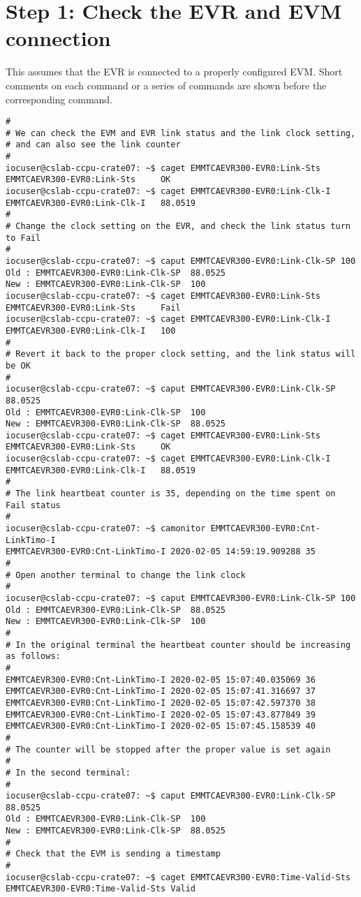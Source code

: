 \documentclass[11pt
  , a4paper
  , article
  , oneside
  , showtrims
]{memoir}
\begin{document}
{\section{Step 1: Check the EVR and EVM connection}
This assumes that the EVR is connected to a properly configured EVM. Short comments on each command or a series of commands are shown before the corresponding command.
\begin{lstlisting}[style=termstyle]
#
# We can check the EVM and EVR link status and the link clock setting,
# and can also see the link counter
#
iocuser@cslab-ccpu-crate07: ~$ caget EMMTCAEVR300-EVR0:Link-Sts
EMMTCAEVR300-EVR0:Link-Sts     OK
iocuser@cslab-ccpu-crate07: ~$ caget EMMTCAEVR300-EVR0:Link-Clk-I
EMMTCAEVR300-EVR0:Link-Clk-I   88.0519
#
# Change the clock setting on the EVR, and check the link status turn to Fail
#
iocuser@cslab-ccpu-crate07: ~$ caput EMMTCAEVR300-EVR0:Link-Clk-SP 100
Old : EMMTCAEVR300-EVR0:Link-Clk-SP  88.0525
New : EMMTCAEVR300-EVR0:Link-Clk-SP  100
iocuser@cslab-ccpu-crate07: ~$ caget EMMTCAEVR300-EVR0:Link-Sts
EMMTCAEVR300-EVR0:Link-Sts     Fail
iocuser@cslab-ccpu-crate07: ~$ caget EMMTCAEVR300-EVR0:Link-Clk-I
EMMTCAEVR300-EVR0:Link-Clk-I   100
#
# Revert it back to the proper clock setting, and the link status will be OK
#
iocuser@cslab-ccpu-crate07: ~$ caput EMMTCAEVR300-EVR0:Link-Clk-SP 88.0525
Old : EMMTCAEVR300-EVR0:Link-Clk-SP  100
New : EMMTCAEVR300-EVR0:Link-Clk-SP  88.0525
iocuser@cslab-ccpu-crate07: ~$ caget EMMTCAEVR300-EVR0:Link-Sts
EMMTCAEVR300-EVR0:Link-Sts     OK
iocuser@cslab-ccpu-crate07: ~$ caget EMMTCAEVR300-EVR0:Link-Clk-I
EMMTCAEVR300-EVR0:Link-Clk-I   88.0519
#
# The link heartbeat counter is 35, depending on the time spent on Fail status
#
iocuser@cslab-ccpu-crate07: ~$ camonitor EMMTCAEVR300-EVR0:Cnt-LinkTimo-I
EMMTCAEVR300-EVR0:Cnt-LinkTimo-I 2020-02-05 14:59:19.909288 35
#
# Open another terminal to change the link clock
#
iocuser@cslab-ccpu-crate07: ~$ caput EMMTCAEVR300-EVR0:Link-Clk-SP 100
Old : EMMTCAEVR300-EVR0:Link-Clk-SP  88.0525
New : EMMTCAEVR300-EVR0:Link-Clk-SP  100
#
# In the original terminal the heartbeat counter should be increasing as follows:
#
EMMTCAEVR300-EVR0:Cnt-LinkTimo-I 2020-02-05 15:07:40.035069 36
EMMTCAEVR300-EVR0:Cnt-LinkTimo-I 2020-02-05 15:07:41.316697 37
EMMTCAEVR300-EVR0:Cnt-LinkTimo-I 2020-02-05 15:07:42.597370 38
EMMTCAEVR300-EVR0:Cnt-LinkTimo-I 2020-02-05 15:07:43.877849 39
EMMTCAEVR300-EVR0:Cnt-LinkTimo-I 2020-02-05 15:07:45.158539 40
#
# The counter will be stopped after the proper value is set again
#
# In the second terminal:
#
iocuser@cslab-ccpu-crate07: ~$ caput EMMTCAEVR300-EVR0:Link-Clk-SP 88.0525
Old : EMMTCAEVR300-EVR0:Link-Clk-SP  100
New : EMMTCAEVR300-EVR0:Link-Clk-SP  88.0525
#
# Check that the EVM is sending a timestamp
#
iocuser@cslab-ccpu-crate07: ~$ caget EMMTCAEVR300-EVR0:Time-Valid-Sts
EMMTCAEVR300-EVR0:Time-Valid-Sts Valid
\end{lstlisting}


}
\end{document}
